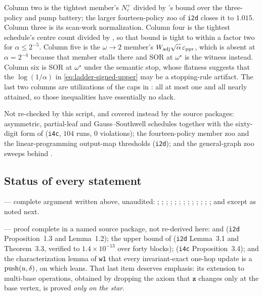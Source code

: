 Column two is the tightest member's $N_{c}^{+}$ divided by
's bound over the three-policy and pump
battery; the larger fourteen-policy zoo of \texttt{i2d} closes it to $1.015$.
Column three is its scan-work normalization. Column four is the tightest
schedule's centre count divided by
, so that bound is tight to within a
factor two for $\alpha\le2^{-5}$. Column five is the $\omega\to2$ member's
$W_{\mathrm{adj}}\sqrt\alpha\,\varepsilon_{\mathrm{ppr}}$, which is absent at $\alpha=2^{-4}$ because that
member stalls there and SOR at $\omega^{\star}$ is the witness instead.
Column six is SOR at $\omega^{\star}$ under the semantic stop, whose
flatness suggests that the $\log(1/\alpha)$ in
\eqref{eq:ladder-signed-upper} may be a stopping-rule artifact. The last two
columns are utilizations of the caps in
: all at most one and all
nearly attained, so those inequalities have essentially no slack.

Not re-checked by this script, and covered instead by the source packages:
asymmetric, partial-leaf and Gauss--Southwell schedules together with the
sixty-digit form of  (\texttt{i4c}, $104$ runs, $0$
violations); the fourteen-policy member zoo and the linear-programming
output-map thresholds (\texttt{i2d}); and the general-graph zoo sweeps behind
.

\subsection*{Status of every statement}

\statusproveddraft{} --- complete argument written above, unaudited:
; ;
; ;
;
;
; ;
; ;
;
; ;
and  except as noted next.

\statusimported{} --- proof complete in a named source package, not
re-derived here:  and
 (\texttt{i2d} Proposition~1.3 and Lemma~1.2);
the upper bound of  (\texttt{i2d}
Lemma~3.1 and Theorem~3.3, verified to $1.4\times10^{-13}$ over forty blocks);
 (\texttt{i4c} Proposition~3.4); and the
characterization lemma of \texttt{w1} that every invariant-exact one-hop
update is a $\operatorname{push}(u,\delta)$, on which  leans. That
last item deserves emphasis: its extension to multi-base operations, obtained
by dropping the axiom that $\bm{z}$ changes only at the base vertex, is proved
\emph{only on the star}.

